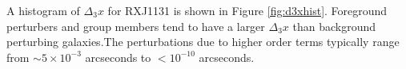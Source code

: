 A histogram of $\Delta_3 x$ for RXJ1131 is shown in Figure \ref{fig:d3xhist}. Foreground perturbers and group members tend to have a larger $\Delta_3 x$ than background perturbing galaxies.The perturbations due to higher order terms typically range from $\sim 5 \times 10^{-3}$ arcseconds to $<10^{-10}$ arcseconds.